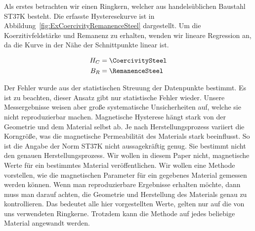 \documentclass[a4paper,10pt,twocolumn]{article}
\begin{document}
    Als erstes betrachten wir einen Ringkern, welcher aus handelsüblichen Baustahl ST37K besteht. 
    Die erfasste Hysteresekurve ist in Abbildung~\ref{fig:ExCoercivityRemanenceSteel} dargestellt.
    Um die Koerzitivfeldstärke und Remanenz zu erhalten, wenden wir lineare Regression an, da die Kurve in der Nähe
    der Schnittpunkte linear ist.
    
    \begin{align*}
        H_C &= \CoercivitySteel \\
        B_R &= \RemanenceSteel
    \end{align*}
    
    Der Fehler wurde aus der statistischen Streuung der Datenpunkte bestimmt.
    Es ist zu beachten, dieser Ansatz gibt nur statistische Fehler wieder.
    Unsere Messergebnisse weisen aber große systematische Unsicherheiten auf, welche sie nicht reproduzierbar machen.
    Magnetische Hysterese hängt stark von der Geometrie und dem Material selbst ab.
    Je nach Herstellungsprozess variiert die Korngröße, was die magnetische Permeabilität des Materials stark beeinflusst.
    So ist die Angabe der Norm ST37K nicht aussagekräftig genug.
    Sie bestimmt nicht den genauen Herstellungsprozess.
    Wir wollen in diesem Paper nicht, magnetische Werte für ein bestimmtes Material veröffentlichen.
    Wir wollen eine Methode vorstellen, wie die magnetischen Parameter für ein gegebenes Material gemessen werden können.
    Wenn man reproduzierbare Ergebnisse erhalten möchte, dann muss man darauf achten, die Geometrie und Herstellung
    des Materials genau zu kontrollieren.
    Das bedeutet alle hier vorgestellten Werte, gelten nur auf die von uns verwendeten Ringkerne.
    Trotzdem kann die Methode auf jedes beliebige Material angewandt werden.
    
\end{document}
